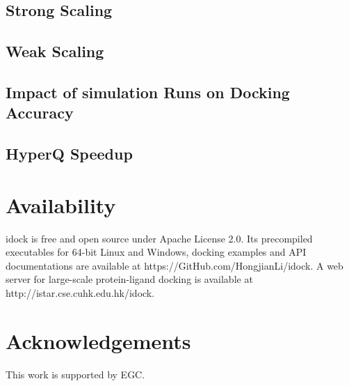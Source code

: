 \documentclass[10pt, conference, compsocconf]{../IEEEtran}
\begin{document}
\subsection{Strong Scaling}



\subsection{Weak Scaling}

\subsection{Impact of simulation Runs on Docking Accuracy}

\subsection{HyperQ Speedup}


\section{Availability}

idock is free and open source under Apache License 2.0. Its precompiled executables for 64-bit Linux and Windows, docking examples and API documentations are available at https://GitHub.com/HongjianLi/idock. A web server for large-scale protein-ligand docking is available at http://istar.cse.cuhk.edu.hk/idock.

\section{Acknowledgements}
This work is supported by EGC.



\end{document}
